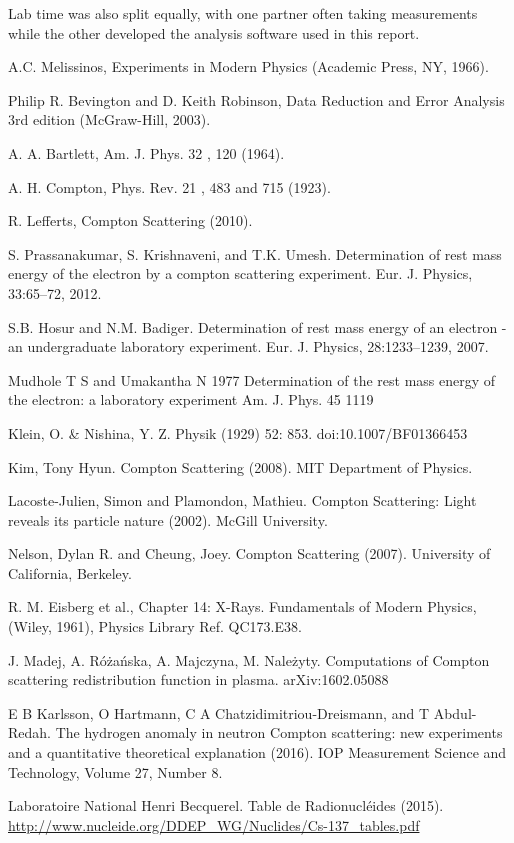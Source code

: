 \documentclass[%
 reprint,
 amsmath,amssymb,
 aps,
 pra,
]{revtex4-1}
\begin{document}
\noindent Lab time was also split equally, with one partner often taking measurements while the other developed the analysis software used in this report.

\begin{thebibliography}{6}
	
	A.C. Melissinos, Experiments in Modern Physics (Academic Press, NY, 1966).
	
	Philip R. Bevington and D. Keith Robinson, Data Reduction and Error Analysis 3rd edition (McGraw-Hill, 2003).

	A. A. Bartlett, Am. J. Phys. 32 , 120 (1964).
	
	A. H. Compton, Phys. Rev. 21 , 483 and 715 (1923).
	
	R. Lefferts, Compton Scattering (2010).
	
	 S. Prassanakumar, S. Krishnaveni, and T.K. Umesh. Determination of rest mass energy of the electron by a compton scattering experiment. Eur. J. Physics, 33:65–72, 2012.
	 
	S.B. Hosur and N.M. Badiger. Determination of rest mass energy of an electron - an undergraduate laboratory experiment. Eur. J. Physics, 28:1233–1239, 2007.
	
	Mudhole T S and Umakantha N 1977 Determination of the rest mass energy of the electron: a laboratory experiment Am. J. Phys. 45 1119
	
	Klein, O. \& Nishina, Y. Z. Physik (1929) 52: 853. doi:10.1007/BF01366453
	
	Kim, Tony Hyun. Compton Scattering (2008). MIT Department of Physics.
	
	Lacoste-Julien, Simon and Plamondon, Mathieu. Compton Scattering: Light reveals its particle nature (2002). McGill University.
	
	Nelson, Dylan R. and  Cheung, Joey. Compton Scattering (2007). University of California,  Berkeley.
	
	R. M. Eisberg et al., Chapter 14: X-Rays. Fundamentals of Modern Physics,  (Wiley, 1961), Physics Library Ref. QC173.E38.
	
	J. Madej, A. Różańska, A. Majczyna, M. Należyty. Computations of Compton scattering redistribution function in plasma. arXiv:1602.05088
	
	E B Karlsson, O Hartmann, C A Chatzidimitriou-Dreismann, and T Abdul-Redah. The hydrogen anomaly in neutron Compton scattering: new experiments and a quantitative theoretical explanation (2016). IOP Measurement Science and Technology, Volume 27, Number 8.

	Laboratoire National Henri Becquerel. Table de Radionucléides (2015). \url{http://www.nucleide.org/DDEP_WG/Nuclides/Cs-137_tables.pdf}


\end{thebibliography}
\end{document}
